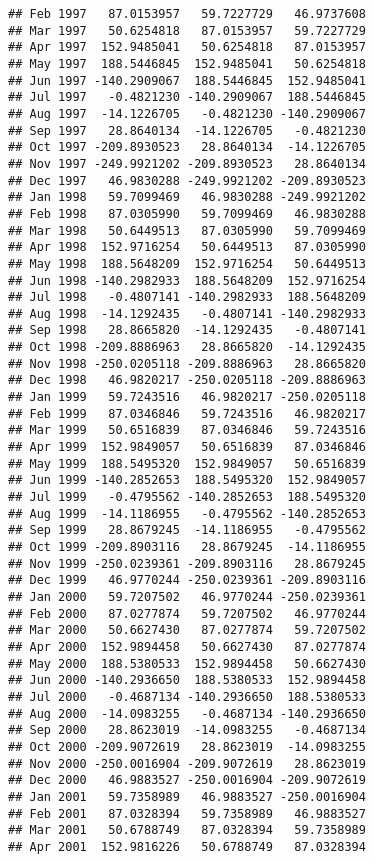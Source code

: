 \documentclass[]{article}
\begin{document}
\begin{verbatim}
## Feb 1997   87.0153957   59.7227729   46.9737608
## Mar 1997   50.6254818   87.0153957   59.7227729
## Apr 1997  152.9485041   50.6254818   87.0153957
## May 1997  188.5446845  152.9485041   50.6254818
## Jun 1997 -140.2909067  188.5446845  152.9485041
## Jul 1997   -0.4821230 -140.2909067  188.5446845
## Aug 1997  -14.1226705   -0.4821230 -140.2909067
## Sep 1997   28.8640134  -14.1226705   -0.4821230
## Oct 1997 -209.8930523   28.8640134  -14.1226705
## Nov 1997 -249.9921202 -209.8930523   28.8640134
## Dec 1997   46.9830288 -249.9921202 -209.8930523
## Jan 1998   59.7099469   46.9830288 -249.9921202
## Feb 1998   87.0305990   59.7099469   46.9830288
## Mar 1998   50.6449513   87.0305990   59.7099469
## Apr 1998  152.9716254   50.6449513   87.0305990
## May 1998  188.5648209  152.9716254   50.6449513
## Jun 1998 -140.2982933  188.5648209  152.9716254
## Jul 1998   -0.4807141 -140.2982933  188.5648209
## Aug 1998  -14.1292435   -0.4807141 -140.2982933
## Sep 1998   28.8665820  -14.1292435   -0.4807141
## Oct 1998 -209.8886963   28.8665820  -14.1292435
## Nov 1998 -250.0205118 -209.8886963   28.8665820
## Dec 1998   46.9820217 -250.0205118 -209.8886963
## Jan 1999   59.7243516   46.9820217 -250.0205118
## Feb 1999   87.0346846   59.7243516   46.9820217
## Mar 1999   50.6516839   87.0346846   59.7243516
## Apr 1999  152.9849057   50.6516839   87.0346846
## May 1999  188.5495320  152.9849057   50.6516839
## Jun 1999 -140.2852653  188.5495320  152.9849057
## Jul 1999   -0.4795562 -140.2852653  188.5495320
## Aug 1999  -14.1186955   -0.4795562 -140.2852653
## Sep 1999   28.8679245  -14.1186955   -0.4795562
## Oct 1999 -209.8903116   28.8679245  -14.1186955
## Nov 1999 -250.0239361 -209.8903116   28.8679245
## Dec 1999   46.9770244 -250.0239361 -209.8903116
## Jan 2000   59.7207502   46.9770244 -250.0239361
## Feb 2000   87.0277874   59.7207502   46.9770244
## Mar 2000   50.6627430   87.0277874   59.7207502
## Apr 2000  152.9894458   50.6627430   87.0277874
## May 2000  188.5380533  152.9894458   50.6627430
## Jun 2000 -140.2936650  188.5380533  152.9894458
## Jul 2000   -0.4687134 -140.2936650  188.5380533
## Aug 2000  -14.0983255   -0.4687134 -140.2936650
## Sep 2000   28.8623019  -14.0983255   -0.4687134
## Oct 2000 -209.9072619   28.8623019  -14.0983255
## Nov 2000 -250.0016904 -209.9072619   28.8623019
## Dec 2000   46.9883527 -250.0016904 -209.9072619
## Jan 2001   59.7358989   46.9883527 -250.0016904
## Feb 2001   87.0328394   59.7358989   46.9883527
## Mar 2001   50.6788749   87.0328394   59.7358989
## Apr 2001  152.9816226   50.6788749   87.0328394

\end{verbatim}
\end{document}
